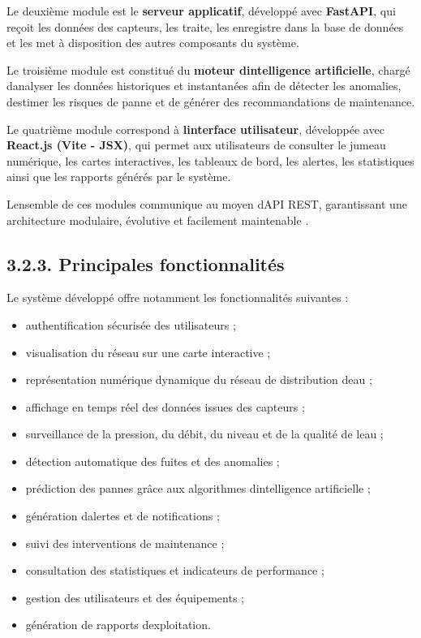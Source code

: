 \documentclass[12pt,a4paper,oneside]{report}
\begin{document}
Le deuxième module est le \textbf{serveur applicatif}, développé avec
\textbf{FastAPI}, qui reçoit les données des capteurs, les traite, les
enregistre dans la base de données et les met à disposition des autres
composants du système.

Le troisième module est constitué du \textbf{moteur
d\textquotesingle intelligence artificielle}, chargé
d\textquotesingle analyser les données historiques et instantanées afin
de détecter les anomalies, d\textquotesingle estimer les risques de
panne et de générer des recommandations de maintenance.

Le quatrième module correspond à \textbf{l\textquotesingle interface
utilisateur}, développée avec \textbf{React.js (Vite - JSX)}, qui permet
aux utilisateurs de consulter le jumeau numérique, les cartes
interactives, les tableaux de bord, les alertes, les statistiques ainsi
que les rapports générés par le système.

L\textquotesingle ensemble de ces modules communique au moyen
d\textquotesingle API REST, garantissant une architecture modulaire,
évolutive et facilement maintenable \cite{ref114}.

\subsection{\texorpdfstring{\textbf{3.2.3. Principales
fonctionnalités}}{3.2.3. Principales fonctionnalités}}\label{principales-fonctionnalituxe9s}

Le système développé offre notamment les fonctionnalités suivantes :

\begin{itemize}
\item
  authentification sécurisée des utilisateurs ;
\item
  visualisation du réseau sur une carte interactive ;
\item
  représentation numérique dynamique du réseau de distribution
  d\textquotesingle eau ;
\item
  affichage en temps réel des données issues des capteurs ;
\item
  surveillance de la pression, du débit, du niveau et de la qualité de
  l\textquotesingle eau ;
\item
  détection automatique des fuites et des anomalies ;
\item
  prédiction des pannes grâce aux algorithmes
  d\textquotesingle intelligence artificielle ;
\item
  génération d\textquotesingle alertes et de notifications ;
\item
  suivi des interventions de maintenance ;
\item
  consultation des statistiques et indicateurs de performance ;
\item
  gestion des utilisateurs et des équipements ;
\item
  génération de rapports d\textquotesingle exploitation.
\end{itemize}
\end{document}
